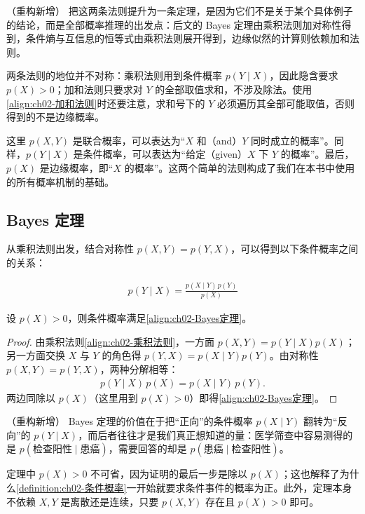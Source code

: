\documentclass[../../main.tex]{subfiles}
\begin{document}
\begin{remark}（重构新增）
把这两条法则提升为一条定理，是因为它们不是关于某个具体例子的结论，而是全部概率推理的出发点：后文的 Bayes 定理由乘积法则加对称性得到，条件熵与互信息的恒等式由乘积法则展开得到，边缘似然的计算则依赖加和法则。

两条法则的地位并不对称：乘积法则用到条件概率 $p(Y\mid X)$，因此隐含要求 $p(X)>0$；加和法则只要求对 $Y$ 的全部取值求和，不涉及除法。使用\eqref{align:ch02-加和法则}时还要注意，求和号下的 $Y$ 必须遍历其全部可能取值，否则得到的不是边缘概率。
\end{remark}

这里 $p(X,Y)$ 是联合概率，可以表达为“$X$ 和（and）$Y$ 同时成立的概率”。同样，$p(Y\mid X)$ 是条件概率，可以表达为“给定（given）$X$ 下 $Y$ 的概率”。最后，$p(X)$ 是边缘概率，即“$X$ 的概率”。这两个简单的法则构成了我们在本书中使用的所有概率机制的基础。

\subsection{Bayes 定理}\label{subsection:ch02-Bayes定理}

从乘积法则出发，结合对称性 $p(X,Y)=p(Y,X)$，可以得到以下条件概率之间的关系：

\begin{align}
  p(Y\mid X) = \frac{p(X\mid Y)\,p(Y)}{p(X)}
  \label{align:ch02-Bayes定理}
\end{align}

\begin{theorem}[Bayes 定理]\label{theorem:ch02-Bayes定理}
设 $p(X)>0$，则条件概率满足\eqref{align:ch02-Bayes定理}。
\end{theorem}

\begin{proof}
由乘积法则\eqref{align:ch02-乘积法则}，一方面 $p(X,Y)=p(Y\mid X)p(X)$；另一方面交换 $X$ 与 $Y$ 的角色得 $p(Y,X)=p(X\mid Y)p(Y)$。由对称性 $p(X,Y)=p(Y,X)$，两种分解相等：
\begin{align*}
  p(Y\mid X)\,p(X) = p(X\mid Y)\,p(Y) .
\end{align*}
两边同除以 $p(X)$（这里用到 $p(X)>0$）即得\eqref{align:ch02-Bayes定理}。
\end{proof}

\begin{remark}（重构新增）
Bayes 定理的价值在于把“正向”的条件概率 $p(X\mid Y)$ 翻转为“反向”的 $p(Y\mid X)$，而后者往往才是我们真正想知道的量：医学筛查中容易测得的是 $p(\text{检查阳性}\mid\text{患癌})$，需要回答的却是 $p(\text{患癌}\mid\text{检查阳性})$。

定理中 $p(X)>0$ 不可省，因为证明的最后一步是除以 $p(X)$；这也解释了为什么\cref{definition:ch02-条件概率}一开始就要求条件事件的概率为正。此外，定理本身不依赖 $X,Y$ 是离散还是连续，只要 $p(X,Y)$ 存在且 $p(X)>0$ 即可。
\end{remark}
\end{document}
